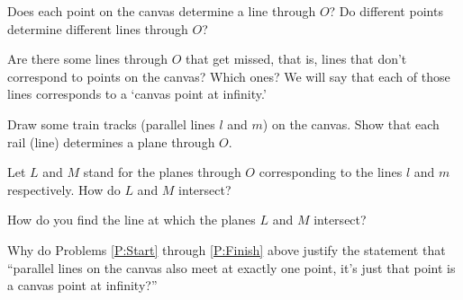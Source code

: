 \begin{prob} 
Does each point on the canvas determine a line through $O$?  Do
different points determine different lines through $O$?
\end{prob}

\begin{prob}\label{P:Start} 
Are there some lines through $O$ that get missed, that is, lines that
don't correspond to points on the canvas? Which ones?  We will say
that each of those lines corresponds to a `canvas point at infinity.'
\end{prob}

\begin{prob} 
Draw some train tracks (parallel lines $l$ and $m$) on the canvas.  Show
that each rail (line) determines a plane through $O$.
\end{prob}

\begin{prob}\label{P:Finish}
Let $L$ and $M$ stand for the planes through $O$ corresponding to the lines
$l$ and $m$ respectively.  How do $L$ and $M$ intersect?
\end{prob}

\begin{prob}
How do you find the line at which the planes $L$ and $M$ intersect?
\end{prob}

\begin{prob} 
Why do Problems \ref{P:Start} through \ref{P:Finish} above justify the
statement that ``parallel lines on the canvas also meet at exactly one
point, it's just that point is a canvas point at infinity?''
\end{prob}




